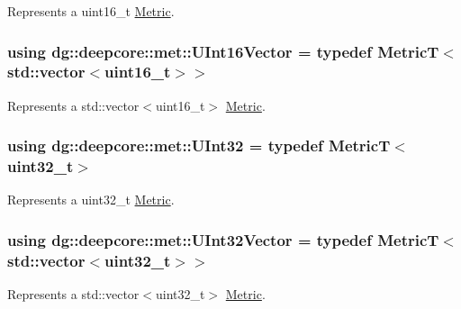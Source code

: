 Represents a {\ttfamily uint16\+\_\+t} \hyperlink{classdg_1_1deepcore_1_1_metric}{Metric}. 

\subsubsection[{\texorpdfstring{U\+Int16\+Vector}{UInt16Vector}}]{\setlength{\rightskip}{0pt plus 5cm}using {\bf dg\+::deepcore\+::met\+::\+U\+Int16\+Vector} = typedef MetricT$<$std\+::vector$<$uint16\+\_\+t$>$$>$}\hypertarget{group___process_metrics_ga188c9966929f876ed38fceadf000c0cd}{}\label{group___process_metrics_ga188c9966929f876ed38fceadf000c0cd}


Represents a {\ttfamily std\+::vector$<$uint16\+\_\+t$>$} \hyperlink{classdg_1_1deepcore_1_1_metric}{Metric}. 

\subsubsection[{\texorpdfstring{U\+Int32}{UInt32}}]{\setlength{\rightskip}{0pt plus 5cm}using {\bf dg\+::deepcore\+::met\+::\+U\+Int32} = typedef MetricT$<$uint32\+\_\+t$>$}\hypertarget{group___process_metrics_gab9fce2fcdfa656ff597d286163c3e220}{}\label{group___process_metrics_gab9fce2fcdfa656ff597d286163c3e220}


Represents a {\ttfamily uint32\+\_\+t} \hyperlink{classdg_1_1deepcore_1_1_metric}{Metric}. 

\subsubsection[{\texorpdfstring{U\+Int32\+Vector}{UInt32Vector}}]{\setlength{\rightskip}{0pt plus 5cm}using {\bf dg\+::deepcore\+::met\+::\+U\+Int32\+Vector} = typedef MetricT$<$std\+::vector$<$uint32\+\_\+t$>$$>$}\hypertarget{group___process_metrics_ga6149d91758b5b2efea24946ce8017e00}{}\label{group___process_metrics_ga6149d91758b5b2efea24946ce8017e00}


Represents a {\ttfamily std\+::vector$<$uint32\+\_\+t$>$} \hyperlink{classdg_1_1deepcore_1_1_metric}{Metric}. 

